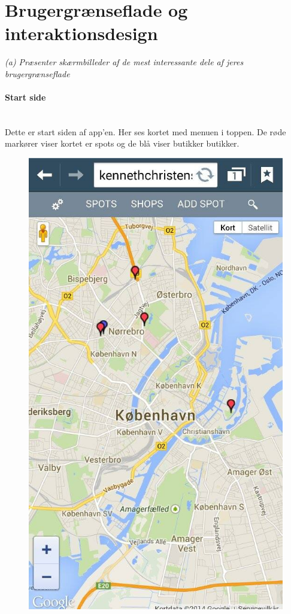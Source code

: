 \documentclass[12pt]{article}
\begin{document}
\section{Brugergrænseflade og interaktionsdesign}
\textit{(a) Præsenter skærmbilleder af de mest interessante dele af jeres brugergrænseflade}

\paragraph{Start side}\mbox{}\\
Dette er start siden af app'en. Her ses kortet med menuen i toppen. De røde markører viser kortet er spots og de blå viser butikker butikker.\\
\begin{figure}[h]
\includegraphics[scale = 0.3]{mobil1}
\end{figure}
\end{document}
